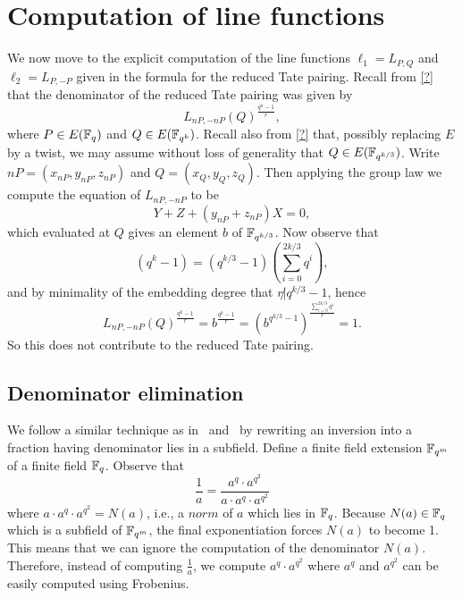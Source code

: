 \section{Computation of line functions}

We now move to the explicit computation of the line functions $\ell_{1} = L_{P,Q}$ and $\ell_{2} = L_{P,-P}$ given in the formula for the reduced Tate pairing. Recall from \ref{?} that the denominator of the reduced Tate pairing was given by
\[L_{nP,-nP}(Q)^{\frac{q^{k}-1}{r}},\] where $P \in E(\mathbb{F}_{q})$ and $Q \in E(\mathbb{F}_{q^{k}})$. Recall also from \ref{?} that, possibly replacing $E$ by a twist, we may assume without loss of generality that $Q \in E(\mathbb{F}_{q^{k/3}})$. Write $nP = (x_{nP},y_{nP},z_{nP})$ and $Q=(x_{Q},y_{Q},z_{Q})$. Then applying the group law we compute the equation of $L_{nP,-nP}$ to be
\[Y + Z + (y_{nP} + z_{nP})X = 0,\] which evaluated at $Q$ gives an element $b$ of $\mathbb{F}_{q^{k/3}}$. Now observe that
\[(q^{k} -1) = (q^{k/3}-1)(\sum_{i=0}^{2k/3} q^{i}),\] and by minimality of the embedding degree that $r \not | q^{k/3}-1$, hence
\[L_{nP,-nP}(Q)^{\frac{q^{k}-1}{r}} = b^{\frac{q^{k}-1}{r}} = (b^{q^{k/3}-1})^\frac{\sum_{i=0}^{2k/3} q^{i}}{r} = 1.\] So this does not contribute to the reduced Tate pairing.



\subsection{Denominator elimination}
We follow a similar technique as in~\cite{2008/lin} and~\cite{2011/mrabet}
by rewriting an inversion into a fraction having denominator lies in a subfield.
Define a finite field extension $\mathbb{F}_{q^m}$ of a finite field $\mathbb{F}_{q}$.
%
Observe that
$$ \frac{1}{a} = \frac{a^q \cdot a^{q^2}} {a \cdot a^{q} \cdot a^{q^2}} $$
where $a \cdot a^{q} \cdot a^{q^2} = N(a)$, i.e., a $norm$ of $a$ which lies in $\mathbb{F}_{q}$.
Because $N(a) \in \mathbb{F}_{q}$ which is a subfield of $\mathbb{F}_{q^m}$,
the final exponentiation forces $N(a)$ to become 1.
This means that we can ignore the computation of the denominator $N(a)$.
Therefore, instead of computing $\frac{1}{a}$,
we compute $a^{q} \cdot a^{q^2}$ where
$a^{q}$ and $a^{q^2}$ can be easily computed using Frobenius.

